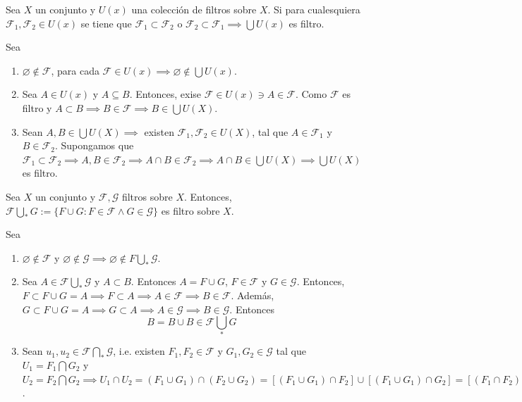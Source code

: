 \begin{teorema}
    Sea $X$ un conjunto y $U(x)$ una colección de filtros sobre $X$. Si para cualesquiera $\mathcal{F}_1,\mathcal{F}_2\in U(x)$ se tiene que $\mathcal{F}_1\subset \mathcal{F}_2$ o $\mathcal{F}_2\subset \mathcal{F}_1\implies \bigcup U(x)$ es filtro. 
    \begin{dem}
        Sea 
        \begin{enumerate}
            \item $\varnothing \not\in \mathcal{F}$, para cada $\mathcal{F}\in U(x)\implies \varnothing \not\in \bigcup U(x)$.
            \item Sea $A\in U(x)$ y $A\subseteq B$. Entonces, exise $\mathcal{F}\in U(x)\ni A\in \mathcal{F}$. Como $\mathcal{F}$ es filtro y $A\subset B\implies B\in \mathcal{F}\implies B\in \bigcup U(X)$.
            \item Sean $A,B\in \bigcup U(X)\implies$ existen $\mathcal{F}_1,\mathcal{F}_2\in U(X)$, tal que $A\in \mathcal{F}_1$ y $B\in \mathcal{F}_2$. Supongamos que $\mathcal{F}_1\subset \mathcal{F}_2\implies A,B\in \mathcal{F}_2\implies A\cap B\in \mathcal{F}_2\implies A\cap B\in \bigcup U(X)\implies \bigcup U(X)$ es filtro. 
        \end{enumerate}
    \end{dem}
\end{teorema}

\begin{prop}
    Sea $X$ un conjunto y $\mathcal{F}, \mathcal{G}$ filtros sobre $X$. Entonces, $\mathcal{F}\bigcup_* G:=\{F\cup G:F\in \mathcal{F}\wedge G\in \mathcal{G}\}$ es filtro sobre $X$. 
    \begin{dem}
        Sea 
        \begin{enumerate}
            \item $\varnothing \not\in \mathcal{F}$ y $\varnothing\not\in \mathcal{G}\implies\varnothing \not\in F\bigcup_* \mathcal{G}$. 
            \item Sea $A\in \mathcal{F}\bigcup_* \mathcal{G}$ y $A\subset B$. Entonces $A=F\cup G$, $F\in \mathcal{F}$ y $G\in \mathcal{G}$. Entonces, $F\subset F\cup G=A \implies F\subset A\implies A\in \mathcal{F}\implies B\in\mathcal{F}$. Además, $G\subset F\cup G=A\implies G\subset A\implies A\in \mathcal{G}\implies B\in \mathcal{G}$. Entonces 
            $$B=B\cup B\in \mathcal{F}\bigcup_* G$$
            \item Sean $u_1,u_2\in \mathcal{F}\bigcap_* \mathcal{G}$, i.e. existen $F_1,F_2\in \mathcal{F}$ y $G_1,G_2\in \mathcal{G}$ tal que $U_1=F_1\bigcap G_2$ y $U_2=F_2\bigcap G_2\implies U_1\cap U_2=(F_1\cup G_1)\cap (F_2\cup G_2)=[(F_1\cup G_1)\cap F_2]\cup [(F_1\cup G_1)\cap G_2]=[(F_1\cap F_2)\cup (G_1\cap F_2)]\cup [(F_1\cap G_2)\cup (G_1\cap G_2)]\implies F_1\cap F_2\subset (F_1\cap F_2)\cup (G_1\cap F_2)\in \mathcal{F}\implies (F_1\cap G_2)\cup (G_1\cap G_2)\in \mathcal{G}\implies U_1\cap U_2\in \mathcal{F}\bigcup_* \mathcal{G}$.
        \end{enumerate}
    \end{dem}
\end{prop}


